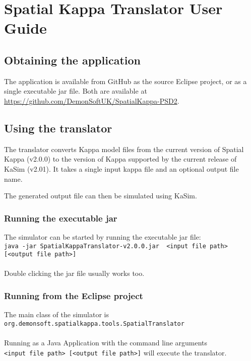 \chapter{Spatial Kappa Translator User Guide}

\section{Obtaining the application}

The application is available from GitHub as the source Eclipse project, or as a single executable jar file. Both are available at \url{https://github.com/DemonSoftUK/SpatialKappa-PSD2}.

\section{Using the translator}

The translator converts Kappa model files from the current version of Spatial Kappa (v2.0.0) to the version of Kappa supported by the current release of KaSim (v2.01). It takes a single input kappa file and an optional output file name.

The generated output file can then be simulated using KaSim.

\subsection{Running the executable jar}

The simulator can be started by running the executable jar file:\\
\verb|java -jar SpatialKappaTranslator-v2.0.0.jar  <input file path> [<output file path>]|\\\\
Double clicking the jar file usually works too.

\subsection{Running from the Eclipse project}

The main class of the simulator is \\
\verb|org.demonsoft.spatialkappa.tools.SpatialTranslator|\\\\
Running as a Java Application with the command line arguments\\ \verb|<input file path> [<output file path>]| will execute the translator.

